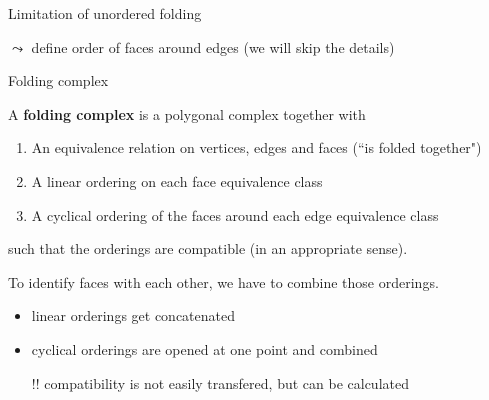 \begin{frame}{Limitation of unordered folding}
\begin{center}
    \end{center}

    \pause
    $\leadsto$ define order of faces around edges
    \pause
    (we will skip the details)
\end{frame}


\begin{frame}{Folding complex}
    \pause
    \begin{defi}
        A \textbf{folding complex}
        \pause
        is a polygonal complex together with
        \begin{enumerate}
            \pause
            \item An equivalence relation on vertices, edges and faces
                \pause (``is folded together")
            \pause
            \item A linear ordering on each face equivalence class
            \pause
            \item A cyclical ordering of the faces around each edge equivalence class
        \end{enumerate}
        \pause
        such that the orderings are compatible
        \pause
        (in an appropriate sense).
    \end{defi}

    \pause
    To identify faces with each other, we have to combine those orderings.
    \begin{itemize}
        \pause
        \item linear orderings get concatenated
        \pause
        \item cyclical orderings are opened at one point
            \pause
            and combined
        \pause
        \item[!!] compatibility is not easily transfered,
            \pause
            but can be calculated
    \end{itemize}

\end{frame}


